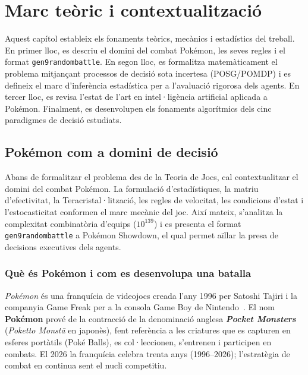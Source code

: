 \chapter{Marc teòric i contextualització}
\label{chap:marc_teoric}

Aquest capítol estableix els fonaments teòrics, mecànics i estadístics del treball. En primer lloc, es descriu el domini del combat Pokémon, les seves regles i el format \texttt{gen9randombattle}. En segon lloc, es formalitza matemàticament el problema mitjançant processos de decisió sota incertesa (POSG/POMDP) i es defineix el marc d'inferència estadística per a l'avaluació rigorosa dels agents. En tercer lloc, es revisa l'estat de l'art en intel·ligència artificial aplicada a Pokémon. Finalment, es desenvolupen els fonaments algorítmics dels cinc paradigmes de decisió estudiats.

\section{Pokémon com a domini de decisió}
\label{sec:pokemon_joc}

Abans de formalitzar el problema des de la Teoria de Jocs, cal contextualitzar el domini del combat Pokémon. La formulació d'estadístiques, la matriu d'efectivitat, la Teracristal·lització, les regles de velocitat, les condicions d'estat i l'estocasticitat conformen el marc mecànic del joc. Així mateix, s'analitza la complexitat combinatòria d'equips ($10^{139}$) i es presenta el format \texttt{gen9randombattle} a Pokémon Showdown, el qual permet aïllar la presa de decisions executives dels agents.

\subsection{Què és Pokémon i com es desenvolupa una batalla}

\textit{Pokémon} és una franquícia de videojocs creada l'any 1996 per Satoshi Tajiri i la companyia Game Freak per a la consola Game Boy de Nintendo~\cite{pokemon_official}. El nom \textbf{Pokémon} prové de la contracció de la denominació anglesa \textbf{\emph{Pocket Monsters}} (\emph{Poketto Monstā} en japonès), fent referència a les criatures que es capturen en esferes portàtils (Poké Balls), es col·leccionen, s'entrenen i participen en combats. El 2026 la franquícia celebra trenta anys (1996--2026); l'estratègia de combat en continua sent el nucli competitiu.

